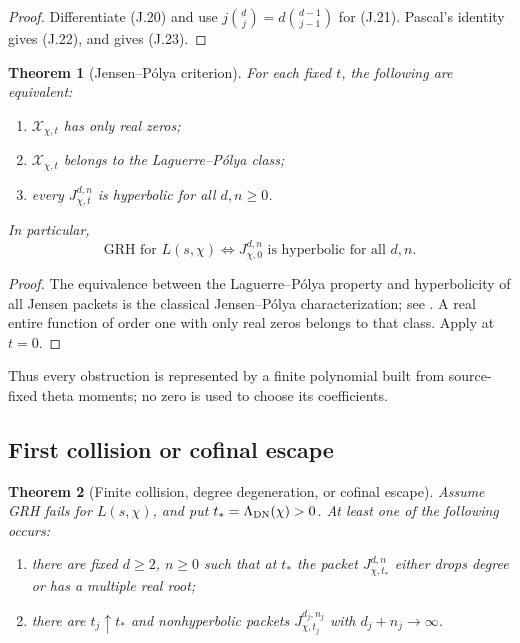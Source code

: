 \documentclass[11pt]{article}
\newtheorem{theorem}{Theorem}[section]
\theoremstyle{definition}
\theoremstyle{remark}
\begin{document}
\begin{proof}
Differentiate \textup{(J.20)} and use
$j\binom dj=d\binom{d-1}{j-1}$ for \textup{(J.21)}.  Pascal's identity gives
\textup{(J.22)}, and  gives \textup{(J.23)}.
\end{proof}

\begin{theorem}[Jensen--P\'olya criterion]
\label{thm:theta-Jensen-Polya}
For each fixed $t$, the following are equivalent:
\begin{enumerate}[label=\textup{(\roman*)},leftmargin=2.8em]
\item $\mathscr X_{\chi,t}$ has only real zeros;
\item $\mathscr X_{\chi,t}$ belongs to the Laguerre--P\'olya class;
\item every $J_{\chi,t}^{d,n}$ is hyperbolic for all $d,n\ge0$.
\end{enumerate}
In particular,
\[
 \boxed{
 \text{GRH for }L(s,\chi)
 \iff J_{\chi,0}^{d,n}\text{ is hyperbolic for all }d,n.}
 \tag{J.24}
\]
\end{theorem}

\begin{proof}
The equivalence between the Laguerre--P\'olya property and hyperbolicity of all
Jensen packets is the classical Jensen--P\'olya characterization; see
\cite{CravenCsordas}.  A real entire function of order one with only real
zeros belongs to that class.  Apply  at $t=0$.
\end{proof}

Thus every obstruction is represented by a finite polynomial built from
source-fixed theta moments; no zero is used to choose its coefficients.

\subsection{First collision or cofinal escape}

\begin{theorem}[Finite collision, degree degeneration, or cofinal escape]
\label{thm:theta-collision-or-escape}
Assume GRH fails for $L(s,\chi)$, and put
$t_*=\Lambda_{\rm DN}(\chi)>0$.  At least one of the following occurs:
\begin{enumerate}[label=\textup{(C\arabic*)},leftmargin=3.2em]
\item there are fixed $d\ge2$, $n\ge0$ such that at $t_*$ the packet
      $J_{\chi,t_*}^{d,n}$ either drops degree or has a multiple real root;
\item there are $t_j\uparrow t_*$ and nonhyperbolic packets
      $J_{\chi,t_j}^{d_j,n_j}$ with $d_j+n_j\to\infty$.
\end{enumerate}
\end{theorem}
\end{document}
